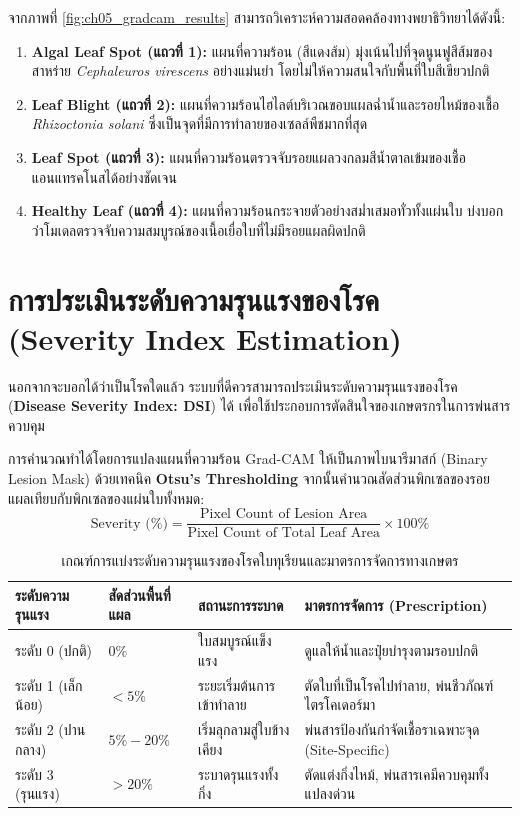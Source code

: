 จากภาพที่ \ref{fig:ch05_gradcam_results} สามารถวิเคราะห์ความสอดคล้องทางพยาธิวิทยาได้ดังนี้:
\begin{enumerate}[leftmargin=1.5em, itemsep=2pt]
    \item \textbf{Algal Leaf Spot (แถวที่ 1):} แผนที่ความร้อน (สีแดงส้ม) มุ่งเน้นไปที่จุดนูนฟูสีส้มของสาหร่าย \textit{Cephaleuros virescens} อย่างแม่นยำ โดยไม่ให้ความสนใจกับพื้นที่ใบสีเขียวปกติ
    \item \textbf{Leaf Blight (แถวที่ 2):} แผนที่ความร้อนไฮไลต์บริเวณขอบแผลฉ่ำน้ำและรอยไหม้ของเชื้อ \textit{Rhizoctonia solani} ซึ่งเป็นจุดที่มีการทำลายของเซลล์พืชมากที่สุด
    \item \textbf{Leaf Spot (แถวที่ 3):} แผนที่ความร้อนตรวจจับรอยแผลวงกลมสีน้ำตาลเข้มของเชื้อแอนแทรคโนสได้อย่างชัดเจน
    \item \textbf{Healthy Leaf (แถวที่ 4):} แผนที่ความร้อนกระจายตัวอย่างสม่ำเสมอทั่วทั้งแผ่นใบ บ่งบอกว่าโมเดลตรวจจับความสมบูรณ์ของเนื้อเยื่อใบที่ไม่มีรอยแผลผิดปกติ
\end{enumerate}

\section{การประเมินระดับความรุนแรงของโรค (Severity Index Estimation)}

นอกจากจะบอกได้ว่าเป็นโรคใดแล้ว ระบบที่ดีควรสามารถประเมินระดับความรุนแรงของโรค (\textbf{Disease Severity Index: DSI}) ได้ เพื่อใช้ประกอบการตัดสินใจของเกษตรกรในการพ่นสารควบคุม

การคำนวณทำได้โดยการแปลงแผนที่ความร้อน Grad-CAM ให้เป็นภาพไบนารีมาสก์ (Binary Lesion Mask) ด้วยเทคนิค \textbf{Otsu's Thresholding} จากนั้นคำนวณสัดส่วนพิกเซลของรอยแผลเทียบกับพิกเซลของแผ่นใบทั้งหมด:
\begin{equation}
\text{Severity (\%)} = \frac{\text{Pixel Count of Lesion Area}}{\text{Pixel Count of Total Leaf Area}} \times 100\%
\end{equation}

\begin{table}[H]
\caption{เกณฑ์การแบ่งระดับความรุนแรงของโรคใบทุเรียนและมาตรการจัดการทางเกษตร}
\label{tab:ch05_severity_levels}
\begin{tabularx}{\textwidth}{L{2.6cm}C{2.6cm}L{3.2cm}Y}
\toprule
\textbf{ระดับความรุนแรง} & \textbf{สัดส่วนพื้นที่แผล} & \textbf{สถานะการระบาด} & \textbf{มาตรการจัดการ (Prescription)} \\
\midrule
ระดับ 0 (ปกติ) & $0\%$ & ใบสมบูรณ์แข็งแรง & ดูแลให้น้ำและปุ๋ยบำรุงตามรอบปกติ \\
ระดับ 1 (เล็กน้อย) & $< 5\%$ & ระยะเริ่มต้นการเข้าทำลาย & ตัดใบที่เป็นโรคไปทำลาย, พ่นชีวภัณฑ์ไตรโคเดอร์มา \\
ระดับ 2 (ปานกลาง) & $5\% - 20\%$ & เริ่มลุกลามสู่ใบข้างเคียง & พ่นสารป้องกันกำจัดเชื้อราเฉพาะจุด (Site-Specific) \\
ระดับ 3 (รุนแรง) & $> 20\%$ & ระบาดรุนแรงทั้งกิ่ง & ตัดแต่งกิ่งไหม้, พ่นสารเคมีควบคุมทั้งแปลงด่วน \\
\bottomrule
\end{tabularx}
\end{table}

